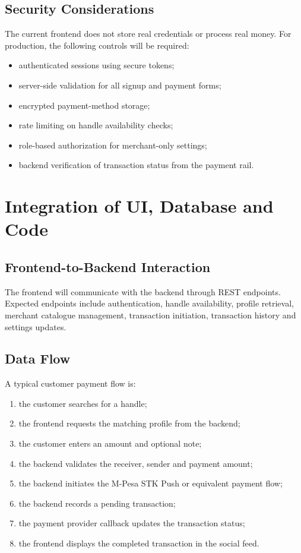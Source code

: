 \documentclass[12pt,a4paper]{article}
\begin{document}
\subsection{Security Considerations}
The current frontend does not store real credentials or process real money. For production, the following controls will be required:
\begin{itemize}
    \item authenticated sessions using secure tokens;
    \item server-side validation for all signup and payment forms;
    \item encrypted payment-method storage;
    \item rate limiting on handle availability checks;
    \item role-based authorization for merchant-only settings;
    \item backend verification of transaction status from the payment rail.
\end{itemize}

\section{Integration of UI, Database and Code}

\subsection{Frontend-to-Backend Interaction}
The frontend will communicate with the backend through REST endpoints. Expected endpoints include authentication, handle availability, profile retrieval, merchant catalogue management, transaction initiation, transaction history and settings updates.

\subsection{Data Flow}
A typical customer payment flow is:
\begin{enumerate}
    \item the customer searches for a handle;
    \item the frontend requests the matching profile from the backend;
    \item the customer enters an amount and optional note;
    \item the backend validates the receiver, sender and payment amount;
    \item the backend initiates the M-Pesa STK Push or equivalent payment flow;
    \item the backend records a pending transaction;
    \item the payment provider callback updates the transaction status;
    \item the frontend displays the completed transaction in the social feed.
\end{enumerate}
\end{document}
